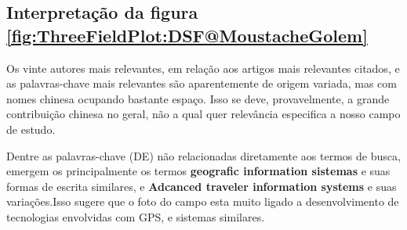 \subsection{Interpretação da figura \ref{fig:ThreeFieldPlot:DSF@MoustacheGolem}}
Os vinte autores mais relevantes, em relação aos artigos mais relevantes citados, e as palavras-chave mais relevantes são aparentemente de origem variada, mas com nomes chinesa ocupando bastante espaço. Isso se deve, provavelmente, a grande contribuição chinesa no geral, não a qual quer relevância especifica a nosso campo de estudo.

Dentre as palavras-chave (DE) não relacionadas diretamente aos termos de busca, emergem os principalmente os termos \textbf{geografic information sistemas} e suas formas de escrita similares, e \textbf{Adcanced traveler information systems} e suas variações.Isso sugere que o foto do campo esta muito ligado a desenvolvimento de tecnologias envolvidas com GPS, e sistemas similares.
